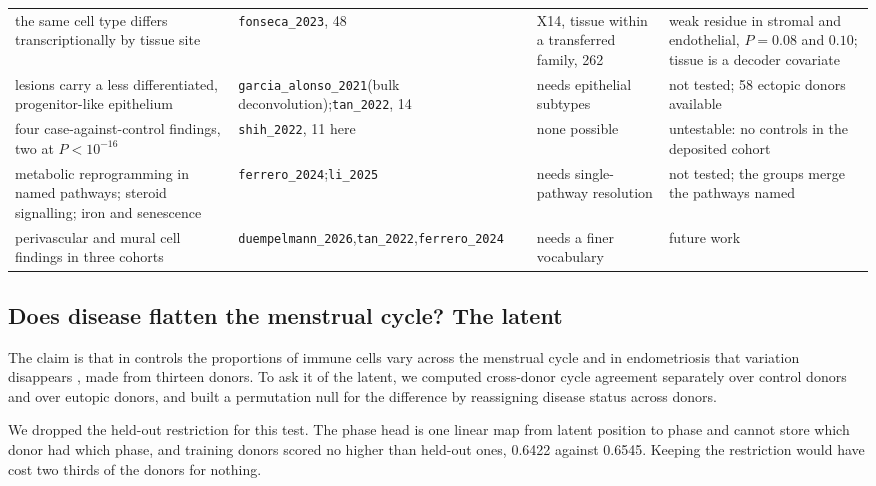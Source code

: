 \begin{table}[p]
\begin{tabular}{@{}p{40mm}p{30mm}p{38mm}p{44mm}@{}}
the same cell type differs transcriptionally by tissue site & \texttt{fonseca\_2023}, 48 & X14, tissue within a transferred family, 262 & weak residue in stromal and endothelial, $P = 0.08$ and $0.10$; tissue is a decoder covariate \\
lesions carry a less differentiated, progenitor-like epithelium & \texttt{garcia\_alonso\_2021}\newline (bulk deconvolution);\newline \texttt{tan\_2022}, 14 & needs epithelial subtypes & not tested; 58 ectopic donors available \\
four case-against-control findings, two at $P < 10^{-16}$ & \texttt{shih\_2022}, 11 here & none possible & untestable: no controls in the deposited cohort \\
metabolic reprogramming in named pathways; steroid signalling; iron and senescence & \texttt{ferrero\_2024};\newline \texttt{li\_2025} & needs single-pathway resolution & not tested; the groups merge the pathways named \\
perivascular and mural cell findings in three cohorts & \texttt{duempelmann\_2026},\newline \texttt{tan\_2022},\newline \texttt{ferrero\_2024} & needs a finer vocabulary & future work \\
\bottomrule
\end{tabular}
\end{table}

\subsection{Does disease flatten the menstrual cycle? The latent}

The claim is that in controls the proportions of immune cells vary across
the menstrual cycle and in endometriosis that variation disappears
\citep{huang2023immune}, made from thirteen donors. To ask it of the
latent, we computed cross-donor cycle agreement separately over control
donors and over eutopic donors, and built a permutation null for the
difference by reassigning disease status across donors.

We dropped the held-out restriction for this test. The phase head is one
linear map from latent position to phase and cannot store which donor had
which phase, and training donors scored no higher than held-out ones,
0.6422 against 0.6545. Keeping the restriction would have cost two thirds
of the donors for nothing.

